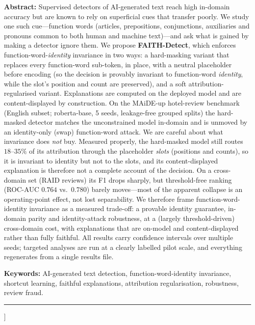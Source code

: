 \documentclass[10pt,twocolumn]{article}
\begin{document}
  \begin{center}\begin{minipage}{0.93\textwidth}
    \small
    \noindent\textbf{Abstract:} Supervised detectors of AI-generated text reach high in-domain
    accuracy but are known to rely on superficial cues that transfer poorly. We study one such
    cue---function words (articles, prepositions, conjunctions, auxiliaries and pronouns common to
    both human and machine text)---and ask what is gained by making a detector ignore them. We
    propose \textbf{FAITH-Detect}, which enforces function-word-\emph{identity} invariance in two ways: a hard-masking
    variant that replaces every function-word sub-token, in place, with a neutral placeholder before
    encoding (so the decision is provably invariant to function-word \emph{identity}, while the slot's
    position and count are preserved), and a soft attribution-regularised variant. Explanations are
    computed on the deployed model and are content-displayed by construction. On the MAiDE-up
    hotel-review benchmark (English subset; roberta-base, 5 seeds, leakage-free grouped splits) the
    hard-masked detector matches the unconstrained model in-domain and is unmoved by an
    identity-only (swap) function-word attack. We are careful about what invariance does \emph{not} buy.
    Measured properly, the hard-masked model still routes $18$--$35\%$ of its attribution through the
    placeholder \emph{slots} (positions and counts), so it is invariant to identity but not to the slots, and
    its content-displayed explanation is therefore not a complete account of the decision. On a
    cross-domain set (RAID reviews) its F1 drops sharply, but threshold-free ranking (ROC-AUC
    $0.764$ vs.\ $0.780$) barely moves---most of the apparent collapse is an operating-point effect, not
    lost separability. We therefore frame function-word-identity invariance as a measured trade-off: a
    provable identity guarantee, in-domain parity and identity-attack robustness, at a (largely
    threshold-driven) cross-domain cost, with explanations that are on-model and content-displayed
    rather than fully faithful. All results carry confidence intervals over multiple seeds; targeted
    analyses are run at a clearly labelled pilot scale, and everything regenerates from a single results file.\par\vspace{0.6em}
    \noindent\textbf{Keywords:} AI-generated text detection, function-word-identity invariance, shortcut
    learning, faithful explanations, attribution regularisation, robustness, review fraud.
  \end{minipage}\end{center}
  \vspace{0.6em}\hrule\vspace{1.4em}
]
\thispagestyle{plain}
\end{document}
